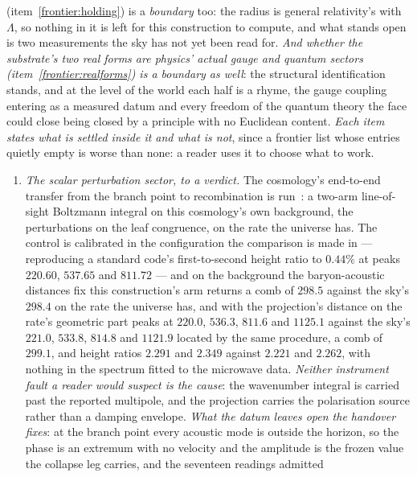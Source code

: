 \documentclass[11pt,a4paper]{article}
\theoremstyle{plain}
\theoremstyle{definition}
\theoremstyle{remark}
\begin{document}
(item~\ref{frontier:holding}) is a \emph{boundary} too: the radius is general relativity's with
$\Lambda$, so nothing in it is left for this construction to compute, and what stands open is two
measurements the sky has not yet been read for. \emph{And whether the substrate's two real forms are physics' actual gauge and quantum sectors (item~\ref{frontier:realforms}) is a boundary as well}: the structural identification stands, and at the level of the world each half is a rhyme, the gauge coupling entering as a measured datum and every freedom of the quantum theory the face could close being closed by a principle with no Euclidean content. \emph{Each item states what is settled inside it and what is not}, since a frontier list whose entries quietly empty is worse than none: a reader uses it to choose what to work.
\begin{enumerate}
\item\label{frontier:scalar} \emph{The scalar perturbation sector, to a verdict.} The cosmology's end-to-end transfer from the branch point to recombination is
run~\cite{JanzenCRcosmology}: a two-arm line-of-sight Boltzmann integral on this cosmology's own
background, the perturbations on the leaf congruence, on the rate the universe has.  The control is
calibrated in the configuration the comparison is made in --- reproducing a standard code's
first-to-second height ratio to $0.44\%$ at peaks $220.60$, $537.65$ and $811.72$ --- and on the background the baryon-acoustic distances fix this construction's arm returns a comb of $298.5$ against the sky's $298.4$ on the rate the universe has, and with the projection's distance on the rate's geometric part peaks at $220.0$, $536.3$, $811.6$ and $1125.1$ against the sky's $221.0$, $533.8$, $814.8$ and $1121.9$ located by the same procedure, a comb of $299.1$, and height ratios $2.291$ and $2.349$ against $2.221$ and $2.262$, with nothing in the spectrum fitted to the microwave data.  \emph{Neither instrument
fault a reader would suspect is the cause}: the wavenumber integral is carried past the reported
multipole, and the projection carries the polarisation source rather than a damping envelope.  \emph{What the datum leaves open the handover
fixes}: at the branch point every acoustic mode is outside the horizon, so the phase is an extremum with no
velocity and the amplitude is the frozen value the collapse leg carries, and the seventeen readings admitted

\end{enumerate}
\end{document}
